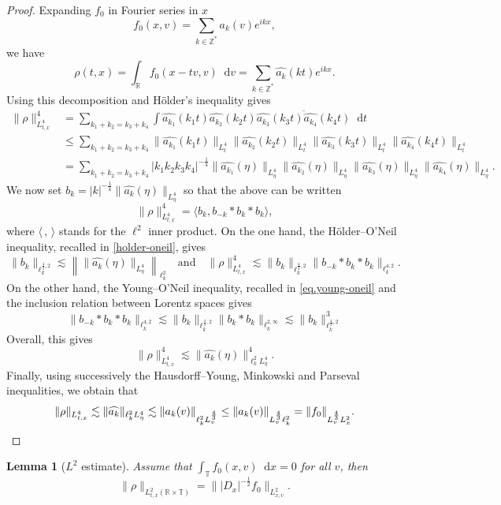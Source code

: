 \documentclass[11pt,a4paper,reqno]{amsart}
\theoremstyle{plain}
\newtheorem{lemma}[theorem]{Lemma}
\theoremstyle{remark}
\newcommand{\dd}{\mathop{}\!\mathrm{d}}
\begin{document}
\begin{proof} 
Expanding $f_0$ in Fourier series in $x$
\[
    f_0(x,v) = \sum_{k \in \mathbb{Z}^*}  a_k(v) e^{i k x},
\]
we have
\[
    \rho(t,x) = \int_{\mathbb{R}} f_0(x-tv,v) \dd v = \sum_{k\in\mathbb{Z}^*} \widehat{a_k}(kt) e^{i k x}.
\]
Using this decomposition and H\"older's inequality gives
\begin{align*}
    \| \rho \|_{L^4_{t,x}}^4 & = \sum_{k_1+k_2 = k_3 + k_4} \int \widehat{a_{k_1}}(k_1 t) \widehat{a_{k_2}}(k_2 t) \overline{\widehat{a_{k_3}}(k_3 t) \widehat{a_{k_4}}(k_4 t)} \dd t \\
    & \leq \sum_{k_1+k_2 = k_3 + k_4} \| \widehat{a_{k_1}}(k_1 t) \|_{L^4_t} \| \widehat{a_{k_2}}(k_2 t) \|_{L^4_t} \| \widehat{a_{k_3}}(k_3 t) \|_{L^4_t} \| \widehat{a_{k_4}}(k_4 t) \|_{L^4_t} \\
    & =  \sum_{k_1+k_2 = k_3 + k_4} |k_1 k_2 k_3 k_4|^{-\frac 14} \| \widehat{a_{k_1}}(\eta) \|_{L^4_\eta} \| \widehat{a_{k_2}}(\eta) \|_{L^4_\eta} \| \widehat{a_{k_3}}(\eta) \|_{L^4_\eta} \| \widehat{a_{k_4}}(\eta) \|_{L^4_\eta}.
\end{align*}
We now set $b_k = |k|^{-\frac 14} \| \widehat{a_k}(\eta) \|_{L^4_\eta}$ so that the above can be written
\[
    \| \rho \|_{L^4_{t,x}}^4 = \langle b_k , b_{-k} * b_k * b_k \rangle,
\]
where $\langle \,,\, \rangle$ stands for the $\ell^2$ inner product. On the one hand, the H\"older--O'Neil inequality, recalled in \eqref{holder-oneil}, gives
\[
    \| b_k \|_{\ell^{\frac 43,2}_k} \lesssim \left\| \| \widehat{a_{k}}(\eta) \|_{L^4_\eta} \right\|_{\ell^2_k} \quad \text{and} \quad
\| \rho \|_{L^4_{t,x}}^4 \lesssim \| b_k \|_{\ell^{\frac 43,2}_k} \| b_{-k} * b_k * b_k \|_{\ell^{4,2}_k}.
\]
On the other hand, the Young--O'Neil inequality, recalled in \eqref{eq.young-oneil} and the inclusion relation between Lorentz spaces gives
\[
    \| b_{-k} * b_k * b_k \|_{\ell^{4,2}_k} \lesssim \| b_k \|_{\ell^{\frac 43,2}_k} \| b_k * b_k \|_{\ell^{2,\infty}_k} \lesssim \| b_k \|_{\ell^{\frac 43,2}_k}^3
\]
Overall, this gives
\[
    \| \rho \|_{L^4_{t,x}}^4 \lesssim \| \widehat{a_{k}}(\eta) \|_{\ell^2_k L^{4}_\eta}^4.
\]
Finally, using successively the Hausdorff--Young, Minkowski and Parseval inequalities, we obtain that
\[
    \| \rho \|_{L^4_{t,x}} \lesssim  \| \widehat{a_k} \|_{\ell^2_k L^{4}_\eta} \lesssim \| a_k(v) \|_{\ell^2_k L^{\frac 43}_v} \leq \| a_k(v) \|_{L^{\frac 43}_v \ell^2_k} = \| f_0 \|_{L^{\frac 43}_v L^2_x}. \qedhere
\]
\end{proof}

\begin{lemma}[$L^2$ estimate]\label{lemmaL2}
Assume that $\int_{\mathbb{T}} f_0(x,v) \dd x = 0$ for all $v$, then
\[
    \| \rho \|_{L^2_{t,x}(\mathbb{R} \times \mathbb{T})} = \| |D_x|^{-\frac 12} f_0 \|_{L^2_{x,v}}.
\]
\end{lemma}
\end{document}
